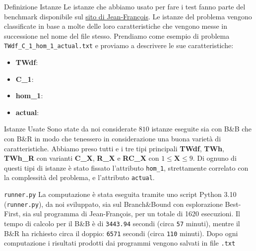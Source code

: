 \documentclass[10pt]{beamer}
\begin{document}
    \begin{frame}{Definizione Istanze}
        Le istanze che abbiamo usato per fare i test fanno parte del benchmark disponibile sul \href{https://sites.google.com/view/jfcote/}{sito di Jean-François}. Le istanze del problema vengono classificate in base a molte delle loro caratteristiche che vengono messe in successione nel nome del file stesso. Prendiamo come esempio di problema \texttt{TWdf\_C\_1\_hom\_1\_actual.txt} e proviamo a descrivere le sue caratteristiche:
        \begin{itemize}
            \item \textbf{TWdf}:
            \item \textbf{C\_1}:
            \item \textbf{hom\_1}:
            \item \textbf{actual}:
        \end{itemize}
    \end{frame}

    \begin{frame}{Istanze Usate}
        Sono state da noi considerate $810$ istanze eseguite sia con B\&B che con B\&R in modo che tenessero in considerazione una buona varietà di caratteristiche. Abbiamo preso tutti e i tre tipi principali \textbf{TWdf}, \textbf{TWh}, \textbf{TWh\_R} con varianti \textbf{C\_X}, \textbf{R\_X} e \textbf{RC\_X} con $1 \leq \textbf{X} \leq 9$. Di ognuno di questi tipi di istanze è stato fissato l'attributo \texttt{hom\_1}, strettamente correlato con la complessità del problema, e l'attributo \texttt{actual}.
    \end{frame}

    \begin{frame}{\texttt{runner.py}}
        La computazione è stata eseguita tramite uno script Python 3.10 (\texttt{runner.py}), da noi sviluppato, sia sul Branch\&Bound con esplorazione Best-First, sia sul programma di Jean-François, per un totale di 1620 esecuzioni. Il tempo di calcolo per il B\&B è di \texttt{3443.94} secondi (circa \texttt{57} minuti), mentre il B\&R ha richiesto circa il doppio: \texttt{6571} secondi (circa \texttt{110} minuti). Dopo ogni computazione i risultati prodotti dai programmi vengono salvati in file \texttt{.txt}
    \end{frame}
\end{document}
